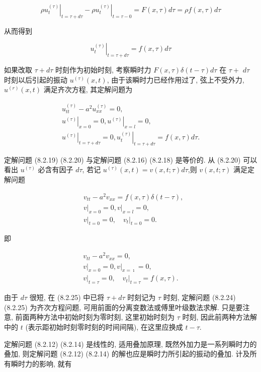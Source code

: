 $$
\left.\rho u_{t}^{(\tau)}\right|_{t=\tau+d \tau}-\left.\rho u_{t}^{(\tau)}\right|_{t=\tau-0}=F(x, \tau) d \tau=\rho f(x, \tau) d \tau
$$

从而得到

$$
\left.u_{t}^{(\tau)}\right|_{t=\tau+d \tau}=f(x, \tau) d \tau
$$

如果改取 $\tau+d \tau$ 时刻作为初始时刻, 考察瞬时力 $F(x, \tau) \delta(t-\tau) d \tau$ 在 $\tau+$
$d \tau$ 时刻以后引起的振动 $u^{(\tau)}(x, t)$, 由于该瞬时力已经作用过了, 弦上不受外力, $u^{(r)}(x, t)$ 满足齐次方程, 其定解问题为

$$
\begin{gathered}
u_{t t}^{(\tau)}-a^{2} u_{x x}^{(\tau)}=0, \\
\left.u^{(\tau)}\right|_{x=0}=0,\left.u^{(\tau)}\right|_{x=l}=0, \\
\left.u^{(\tau)}\right|_{t=\tau+d \tau}=0,\left.u_{t}^{(\tau)}\right|_{t=\tau+d \tau}=f(x, \tau) d \tau .
\end{gathered}
$$

定解问题 (8.2.19) (8.2.20) 与定解问题 (8.2.16) (8.2.18) 是等价的. 从 (8.2.20) 可以看出 $u^{(\tau)}$ 必含有因子 $d \tau$, 若记 $u^{(\tau)}(x, t)=v(x, t ; \tau) d \tau$,则 $v(x, t ; \tau)$ 满足定解问题

$$
\begin{aligned}
& v_{t t}-a^{2} v_{x x}=f(x, \tau) \delta(t-\tau), \\
&\left.v\right|_{x=0}=0,\left.v\right|_{x=l}=0, \\
&\left.v\right|_{t=0}=0,\left.\quad v_{t}\right|_{t=0}=0 .
\end{aligned}
$$

即

$$
\begin{gathered}
v_{t t}-a^{2} v_{x x}=0, \\
\left.v\right|_{x=0}=0,\left.v\right|_{x=\imath}=0, \\
\left.v\right|_{t=\tau}=0,\left.\quad v_{t}\right|_{t=\tau}=f(x, \tau) .
\end{gathered}
$$

由于 $d \tau$ 很短, 在 (8.2.25) 中已将 $\tau+d \tau$ 时刻记为 $\tau$ 时刻, 定解问题 (8.2.24) (8.2.25) 为齐次方程问题, 可用前面的分离变数法或傅里叶级数法求解. 只是要注意, 前面两种方法中初始时刻为零时刻, 这里初始时刻为 $\tau$ 时刻, 因此前两种方法解中的 $t$ (表示距初始时刻零时刻的时间间隔), 在这里应换成 $t-\tau$.

定解问题 (8.2.12) (8.2.14) 是线性的, 适用叠加原理, 既然外加力是一系列瞬时力的叠加, 则定解问题 (8.2.12) (8.2.14) 的解也应是瞬时力所引起的振动的叠加. 计及所有瞬时力的影响, 就有

